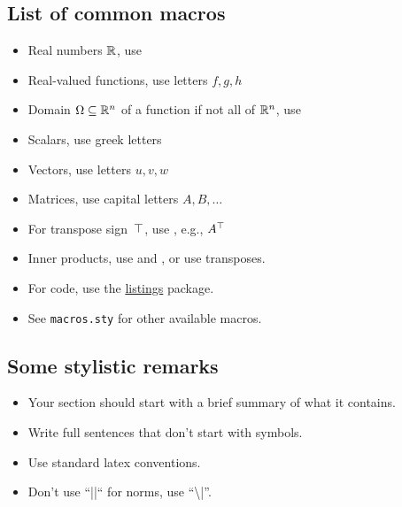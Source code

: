 \documentclass[12pt]{article}
\begin{document}
\subsection*{List of common macros}

\begin{itemize}
\item Real numbers $\mathbb{R}$, use 
\item Real-valued functions, use letters $f, g, h$
\item Domain $\Omega\subseteq\mathbb{R}^n$ of a function if not all of $\mathbb{R}^n$, use 
\item Scalars, use greek letters
\item Vectors, use letters $u, v, w$
\item Matrices, use capital letters $A, B, \dots$
\item For transpose sign~$\top$, use , e.g., $A^\top$
\item Inner products, use  and , or use transposes.
\item For code, use the \href{https://en.wikibooks.org/wiki/LaTeX/Source_Code_Listings}{listings} package.
\item See {\tt macros.sty} for other available macros.
\end{itemize}

\subsection{Some stylistic remarks}

\begin{itemize}
\item Your section should start with a brief summary of what it contains.
\item Write full sentences that don't start with symbols.
\item Use standard latex conventions.
\item Don't use ``||`` for norms, use ``\textbackslash |''.
\end{itemize}
\end{document}
